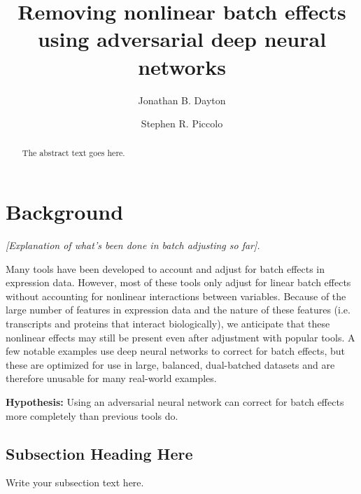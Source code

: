 \documentclass[titlepage]{article}
\begin{document}
\title{Removing nonlinear batch effects using adversarial deep neural networks}
\author[1]{Jonathan B. Dayton}
\author[1]{Stephen R. Piccolo}
\date{}

\maketitle

\begin{abstract}
	The abstract text goes here.
\end{abstract}

\section{Background}

\emph{[Explanation of what's been done in batch adjusting so far].}

Many tools have been developed to account and adjust for batch effects in expression data.
However, most of these tools only adjust for linear batch effects without accounting for nonlinear interactions between variables.
Because of the large number of features in expression data and the nature of these features (i.e. transcripts and proteins that interact biologically), we anticipate that these nonlinear effects may still be present even after adjustment with popular tools.
A few notable examples \cite{shaham_removal_2017,shaham_batch_2018} use deep neural networks to correct for batch effects, but these are optimized for use in large, balanced, dual-batched datasets and are therefore unusable for many real-world examples.

\textbf{Hypothesis:}
Using an adversarial neural network can correct for batch effects more completely than previous tools do. %

\subsection{Subsection Heading Here}
Write your subsection text here.
\end{document}
